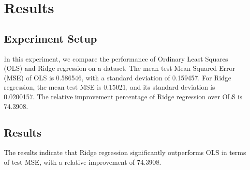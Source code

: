 \section*{Results}

\subsection*{Experiment Setup}

In this experiment, we compare the performance of Ordinary Least Squares (OLS) and Ridge regression on a dataset. The mean test Mean Squared Error (MSE) of OLS is 0.586546, with a standard deviation of 0.159457. For Ridge regression, the mean test MSE is 0.15021, and its standard deviation is 0.0200157. The relative improvement percentage of Ridge regression over OLS is 74.3908.

\subsection*{Results}

The results indicate that Ridge regression significantly outperforms OLS in terms of test MSE, with a relative improvement of 74.3908.